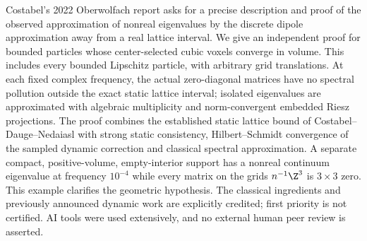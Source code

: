 Costabel's 2022 Oberwolfach report asks for a precise description and proof of the observed approximation of nonreal eigenvalues by the discrete dipole approximation away from a real lattice interval. We give an independent proof for bounded particles whose center-selected cubic voxels converge in volume. This includes every bounded Lipschitz particle, with arbitrary grid translations. At each fixed complex frequency, the actual zero-diagonal matrices have no spectral pollution outside the exact static lattice interval; isolated eigenvalues are approximated with algebraic multiplicity and norm-convergent embedded Riesz projections. The proof combines the established static lattice bound of Costabel--Dauge--Nedaiasl with strong static consistency, Hilbert--Schmidt convergence of the sampled dynamic correction and classical spectral approximation. A separate compact, positive-volume, empty-interior support has a nonreal continuum eigenvalue at frequency $10^{-4}$ while every matrix on the grids $n^{-1}\Z^3$ is $3\times3$ zero. This example clarifies the geometric hypothesis. The classical ingredients and previously announced dynamic work are explicitly credited; first priority is not certified. AI tools were used extensively, and no external human peer review is asserted.
